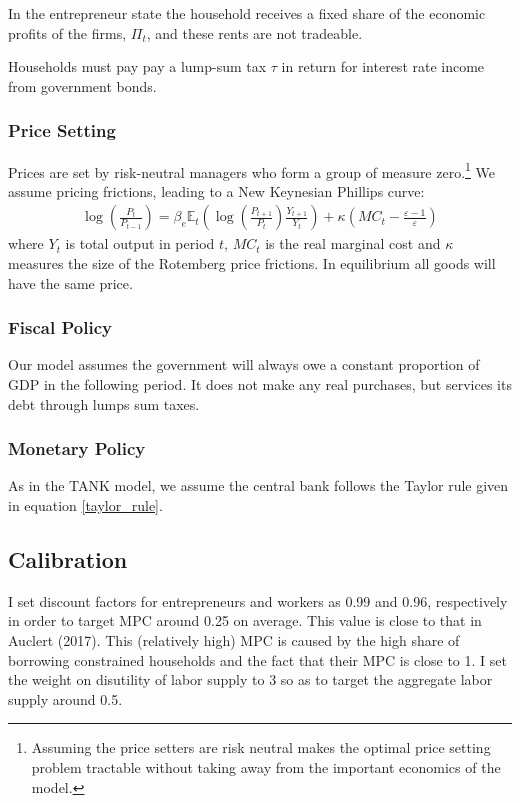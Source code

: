 \documentclass[12pt,a4paper]{article}
\begin{document}
In the entrepreneur state the household receives a fixed share of the economic profits of the firms, $\Pi_t$, and these rents are not tradeable.

Households must pay pay a lump-sum tax $\tau$ in return for interest rate income from government bonds.

\subsubsection{Price Setting}
Prices are set by risk-neutral managers who form a group of measure zero.\footnote{Assuming the price setters are risk neutral makes the optimal price setting problem tractable without taking away from the important economics of the model.} We assume \cite{rotemberg_sticky_1982} pricing frictions, leading to a New Keynesian Phillips curve:
\begin{align*}
\log\left(\frac{P_t}{P_{t-1}}\right) = \beta_e \mathbb{E}_t \left( \log \left(\frac{P_{t+1}}{P_{t}}\right) \frac{Y_{t+1}}{Y_{t}} \right) + \kappa \left( MC_t - \frac{\varepsilon-1}{\varepsilon} \right)
\end{align*}
where $Y_t$ is total output in period $t$, $MC_t$ is the real marginal cost and $\kappa$ measures the size of the Rotemberg price frictions. In equilibrium all goods will have the same price.

\subsubsection{Fiscal Policy}
Our model assumes the government will always owe a constant proportion of GDP in the following period. It does not make any real purchases, but services its debt through lumps sum taxes.


\subsubsection{Monetary Policy}
As in the TANK model, we assume the central bank follows the Taylor rule given in equation \ref{taylor_rule}.

\subsection{Calibration}

I set discount factors for entrepreneurs and workers as 0.99 and 0.96, respectively in order to target MPC around 0.25 on average. This value is close to that in Auclert (2017). This (relatively high) MPC is caused by the high share of borrowing constrained households and the fact that their MPC is close to 1. I set the weight on disutility of labor supply to 3 so as to target the aggregate labor supply around 0.5.
\end{document}
